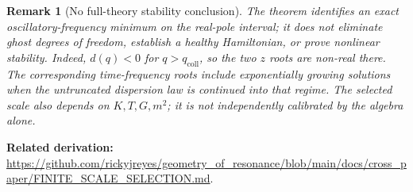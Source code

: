 \documentclass[11pt]{article}
\newtheorem{remark}{Remark}
\begin{document}
\begin{remark}[No full-theory stability conclusion]
The theorem identifies an exact oscillatory-frequency minimum on the
real-pole interval; it does not eliminate ghost degrees of freedom,
establish a healthy Hamiltonian, or prove nonlinear stability.
Indeed, $d(q)<0$ for $q>q_{\mathrm{coll}}$, so the two $z$ roots
are non-real there.  The corresponding time-frequency roots include
exponentially growing solutions when the untruncated dispersion law is
continued into that regime. The selected scale also depends on
$K,T,G,m^2$; it is not independently calibrated by the algebra alone.
\end{remark}

\noindent\textbf{Related derivation:}
\url{https://github.com/rickyjreyes/geometry_of_resonance/blob/main/docs/cross_paper/FINITE_SCALE_SELECTION.md}.
\end{document}
